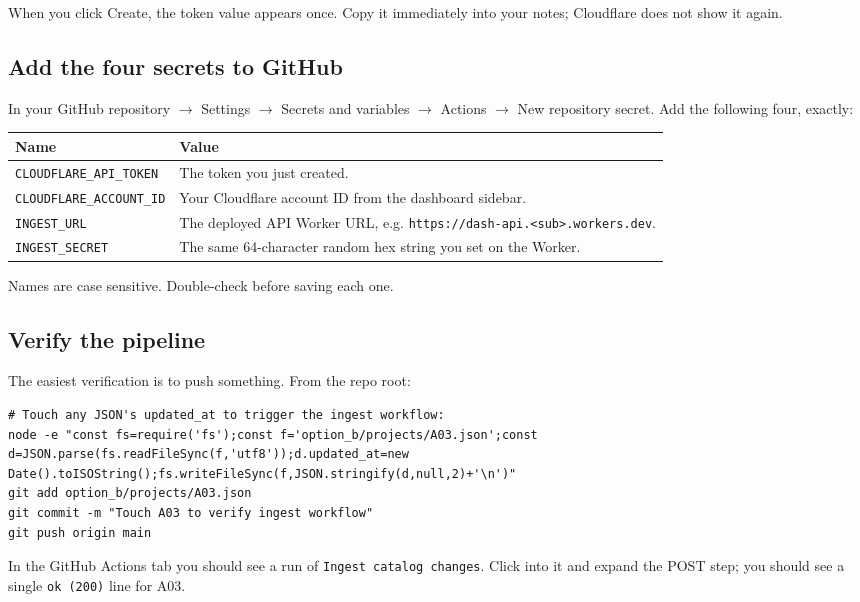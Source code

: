 \documentclass[11pt,a4paper]{article}
\begin{document}
When you click Create, the token value appears once. Copy it immediately into your notes; Cloudflare does not show it again.

\subsection{Add the four secrets to GitHub}

In your GitHub repository \(\rightarrow\) Settings \(\rightarrow\) Secrets and variables \(\rightarrow\) Actions \(\rightarrow\) New repository secret. Add the following four, exactly:

\begin{center}
\begin{tabularx}{\textwidth}{l X}
\toprule
\textbf{Name} & \textbf{Value} \\
\midrule
\texttt{CLOUDFLARE\_API\_TOKEN} & The token you just created. \\
\texttt{CLOUDFLARE\_ACCOUNT\_ID} & Your Cloudflare account ID from the dashboard sidebar. \\
\texttt{INGEST\_URL} & The deployed API Worker URL, e.g. \texttt{https://dash-api.<sub>.workers.dev}. \\
\texttt{INGEST\_SECRET} & The same 64-character random hex string you set on the Worker. \\
\bottomrule
\end{tabularx}
\end{center}

Names are case sensitive. Double-check before saving each one.

\subsection{Verify the pipeline}

The easiest verification is to push something. From the repo root:

\begin{lstlisting}[style=shell]
# Touch any JSON's updated_at to trigger the ingest workflow:
node -e "const fs=require('fs');const f='option_b/projects/A03.json';const d=JSON.parse(fs.readFileSync(f,'utf8'));d.updated_at=new Date().toISOString();fs.writeFileSync(f,JSON.stringify(d,null,2)+'\n')"
git add option_b/projects/A03.json
git commit -m "Touch A03 to verify ingest workflow"
git push origin main
\end{lstlisting}

In the GitHub Actions tab you should see a run of \texttt{Ingest catalog changes}. Click into it and expand the POST step; you should see a single \texttt{ok (200)} line for A03.
\end{document}
